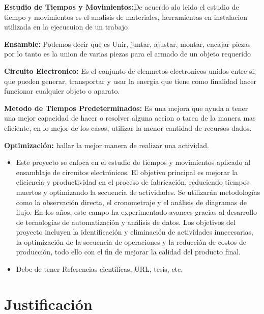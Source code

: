     \item \textbf{Estudio de Tiempos y Movimientos:}De acuerdo alo leido el estudio de tiempo y movimientos es el analisis de materiales, herramientas en instalacion utilizada en la ejecucuion de un trabajo  
    \item \textbf{Ensamble:} Podemos decir que es Unir, juntar, ajustar, montar, encajar piezas por lo tanto es la union de varias piezas para el armado de un objeto requerido
    \item \textbf{Circuito Electronico:} Es el conjunto de elemnetos electronicos unidos entre si, que pueden generar, transportar y usar la energia que tiene como finalidad hacer funcionar cualquier objeto o aparato. 
    \item \textbf{Metodo de Tiempos Predeterminados:}
    Es una mejora que ayuda a tener una mejor capacidad de hacer o resolver alguna accion o tarea de la manera mas eficiente, en lo mejor de los casos, utilizar la menor cantidad de recursos dados.
    \item \textbf{Optimización:}
    hallar la mejor manera de realizar una actividad.
    \begin{itemize}
        \item Este proyecto se enfoca en el estudio de tiempos y movimientos aplicado al ensamblaje de circuitos electrónicos. El objetivo principal es mejorar la eficiencia y productividad en el proceso de fabricación, reduciendo tiempos muertos y optimizando la secuencia de actividades. Se utilizarán metodologías como la observación directa, el cronometraje y el análisis de diagramas de flujo. En los años, este campo ha experimentado avances gracias al desarrollo de tecnologías de automatización y análisis de datos. Los objetivos del proyecto incluyen la identificación y eliminación de actividades innecesarias, la optimización de la secuencia de operaciones y la reducción de costos de producción, todo ello con el fin de mejorar la calidad del producto final.
        \item Debe de tener Referencias científicas, URL, tesis, etc.
        
        \cite{RAE}
        
    \end{itemize}
    \section{Justificación}
    
